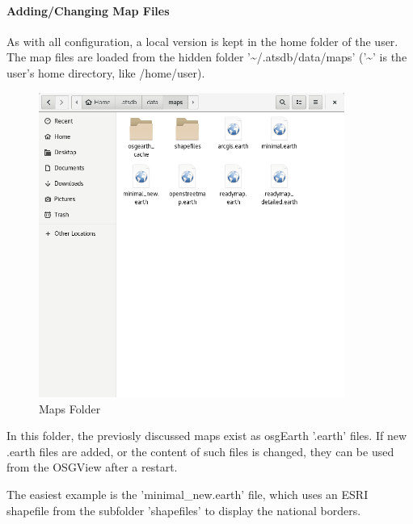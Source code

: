 \paragraph{Adding/Changing Map Files}
\label{sec:adding_maps}

As with all configuration, a local version is kept in the home folder of the user. The map files are loaded from the hidden folder '\textasciitilde/.atsdb/data/maps' ('\textasciitilde' is the user's home directory, like /home/user).

\begin{figure}[H]
    \includegraphics[width=10cm,frame]{../screenshots/maps_config.png}
  \caption{Maps Folder}
\end{figure}

In this folder, the previosly discussed maps exist as osgEarth '.earth' files. If new .earth files are added, or the content of such files is changed, they can be used from the OSGView after a restart.

The easiest example is the 'minimal\_new.earth' file, which uses an ESRI shapefile from the subfolder 'shapefiles' to display the national borders.


